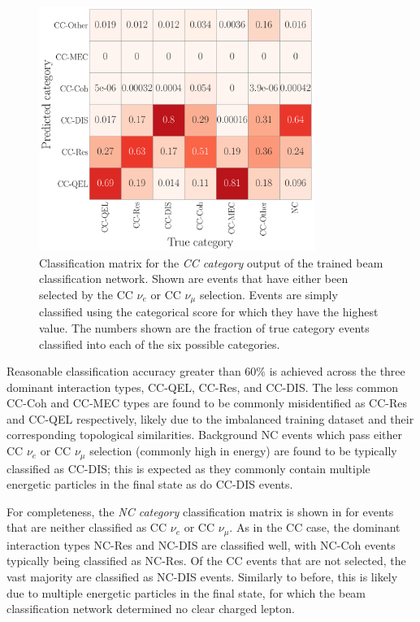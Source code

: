 \begin{figure} %
    \includegraphics[width=0.8\textwidth]{diagrams/7-results/final_cc_cat_confusion.pdf}
    \caption[Classification matrix for the CC category output of the beam classification network]
    {Classification matrix for the \emph{CC category} output of the trained beam classification
        network. Shown are events that have either been selected by the CC $\nu_{e}$ or CC
        $\nu_{\mu}$ selection. Events are simply classified using the categorical score for which
        they have the highest value. The numbers shown are the fraction of true category events
        classified into each of the six possible categories.}
    \label{fig:final_cc_cat_confusion}
\end{figure}

Reasonable classification accuracy greater than 60\% is achieved across the three dominant
interaction types, CC-QEL, CC-Res, and CC-DIS. The less common CC-Coh and CC-MEC types are found
to be commonly misidentified as CC-Res and CC-QEL respectively, likely due to the imbalanced
training dataset and their corresponding topological similarities. Background NC events which pass
either CC $\nu_{e}$ or CC $\nu_{\mu}$ selection (commonly high in energy) are found to be
typically classified as CC-DIS; this is expected as they commonly contain multiple energetic
particles in the final state as do CC-DIS events.

For completeness, the \emph{NC category} classification matrix is shown in
 for events that are neither classified as CC $\nu_{e}$ or
CC $\nu_{\mu}$. As in the CC case, the dominant interaction types NC-Res and NC-DIS are classified
well, with NC-Coh events typically being classified as NC-Res. Of the CC events that are not
selected, the vast majority are classified as NC-DIS events. Similarly to before, this is likely
due to multiple energetic particles in the final state, for which the beam classification network
determined no clear charged lepton.

